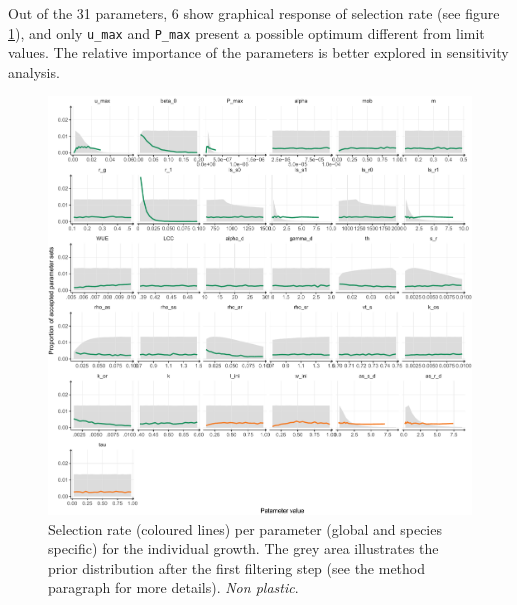 Out of the 31 parameters, 6 show graphical response of selection rate (see figure \ref{fig:accept_rate}), and only  \texttt{u\_max} and \texttt{P\_max} present a possible optimum different from limit values. The relative importance of the parameters is better explored in sensitivity analysis.







\begin{figure}[p]\label{fig:accept_rate}
\includegraphics[width = \textwidth]{./2_PP/Figures/Calibration/acceptance_rate_RSRnWeight_per_par_none.pdf}
\caption[Selection rate of all parameters.]{Selection rate (coloured lines) per parameter  (\textcolor{myGreen}{global} and \textcolor{myOrange}{species specific}) for the individual growth. The grey area illustrates the prior distribution after the first filtering step (see the method paragraph for more details). \textit{Non plastic}.}
\end{figure}


